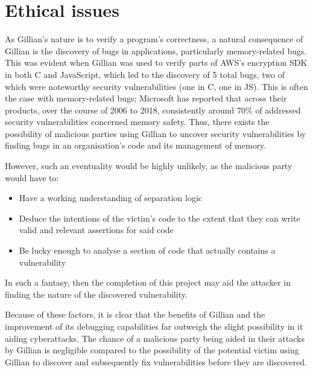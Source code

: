 \chapter{Ethical issues}
\label{cha:ethics}

As Gillian's nature is to verify a program's correctness, a natural consequence of Gillian is the discovery of bugs in applications, particularly memory-related bugs.
This was evident when Gillian was used to verify parts of AWS's encryption SDK in both C and JavaScript, which led to the discovery of 5 total bugs, two of which were noteworthy security vulnerabilities (one in C, one in JS)\cite{gillian-part2}.
This is often the case with memory-related bugs; Microsoft has reported that across their products, over the course of 2006 to 2018, consistently around 70\% of addressed security vulnerabilities concerned memory safety\cite{microsoft-memory-bugs}.
Thus, there exists the possibility of malicious parties using Gillian to uncover security vulnerabilities by finding bugs in an organisation's code and its management of memory.

However, such an eventuality would be highly unlikely, as the malicious party would have to:
\begin{itemize}
  \item Have a working understanding of separation logic
  \item Deduce the intentions of the victim's code to the extent that they can write valid and relevant assertions for said code
  \item Be lucky enough to analyse a section of code that actually contains a vulnerability
\end{itemize}

In such a fantasy, then the completion of this project may aid the attacker in finding the nature of the discovered vulnerability.

Because of these factors, it is clear that the benefits of Gillian and the improvement of its debugging capabilities far outweigh the slight possibility in it aiding cyberattacks.
The chance of a malicious party being aided in their attacks by Gillian is negligible compared to the possibility of the potential victim using Gillian to discover and subsequently fix vulnerabilities before they are discovered.
